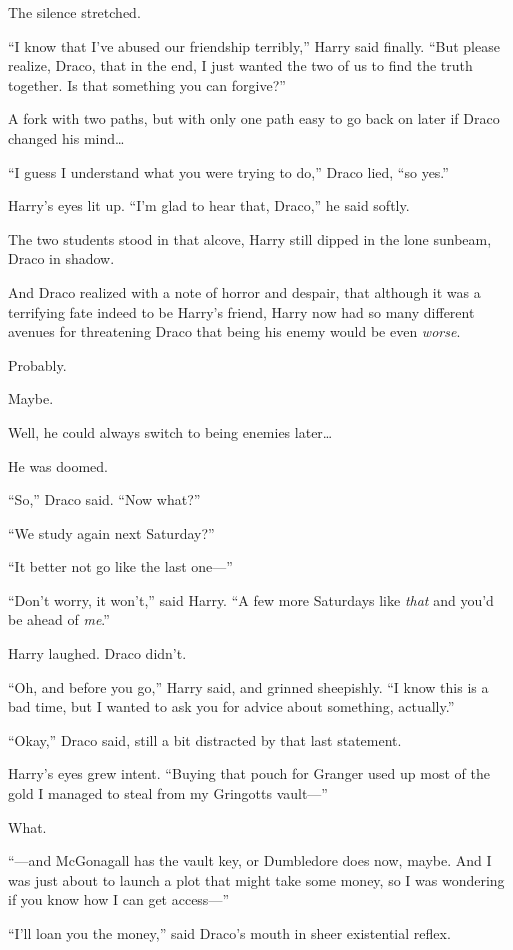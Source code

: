 The silence stretched.

“I know that I’ve abused our friendship terribly,” Harry said finally. “But please realize, Draco, that in the end, I just wanted the two of us to find the truth together. Is that something you can forgive?”

A fork with two paths, but with only one path easy to go back on later if Draco changed his mind…

“I guess I understand what you were trying to do,” Draco lied, “so yes.”

Harry’s eyes lit up. “I’m glad to hear that, Draco,” he said softly.

The two students stood in that alcove, Harry still dipped in the lone sunbeam, Draco in shadow.

And Draco realized with a note of horror and despair, that although it was a terrifying fate indeed to be Harry’s friend, Harry now had so many different avenues for threatening Draco that being his enemy would be even \emph{worse}.

Probably.

Maybe.

Well, he could always switch to being enemies later…

He was doomed.

“So,” Draco said. “Now what?”

“We study again next Saturday?”

“It better not go like the last one—”

“Don’t worry, it won’t,” said Harry. “A few more Saturdays like \emph{that} and you’d be ahead of \emph{me}.”

Harry laughed. Draco didn’t.

“Oh, and before you go,” Harry said, and grinned sheepishly. “I know this is a bad time, but I wanted to ask you for advice about something, actually.”

“Okay,” Draco said, still a bit distracted by that last statement.

Harry’s eyes grew intent. “Buying that pouch for Granger used up most of the gold I managed to steal from my Gringotts vault—”

What.

“—and McGonagall has the vault key, or Dumbledore does now, maybe. And I was just about to launch a plot that might take some money, so I was wondering if you know how I can get access—”

“I’ll loan you the money,” said Draco’s mouth in sheer existential reflex.

